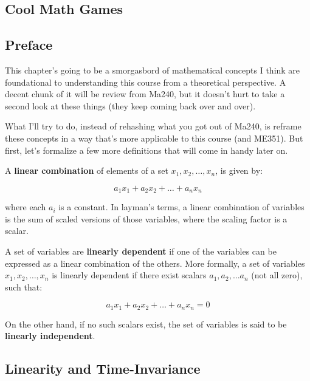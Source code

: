 \documentclass{report}
\begin{document}
\begin{onehalfspacing}
\begin{flushleft}
\pagebreak

\chapter{Cool Math Games}

\section*{Preface}

This chapter's going to be a smorgasbord of mathematical concepts I think are foundational to understanding this course from a theoretical perspective. A decent chunk of it will be review from Ma240, but it doesn't hurt to take a second look at these things (they keep coming back over and over).

\medskip

What I'll try to do, instead of rehashing what you got out of Ma240, is reframe these concepts in a way that's more applicable to this course (and ME351). But first, let's formalize a few more definitions that will come in handy later on.

\medskip

A \textbf{linear combination} of elements of a set \(x_1, x_2, \dots, x_n\), is given by:

\vspace{-0.1in}
\[a_1 x_1 + a_2 x_2 + \dots + a_n x_n \]

where each \(a_i\) is a constant. In layman's terms, a linear combination of variables is the sum of scaled versions of those variables, where the scaling factor is a scalar.

\medskip

A set of variables are \textbf{linearly dependent} if one of the variables can be expressed as a linear combination of the others. More formally, a set of variables \(x_1, x_2, \dots, x_n\) is linearly dependent if there exist scalars \(a_1, a_2, \dots a_n\) (not all zero), such that:

\vspace{-0.1in}
\[a_1 x_1 + a_2 x_2 + \dots + a_n x_n = 0\]

On the other hand, if no such scalars exist, the set of variables is said to be \textbf{linearly independent}. 

\section{Linearity and Time-Invariance}


\end{flushleft}
\end{onehalfspacing}
\end{document}
